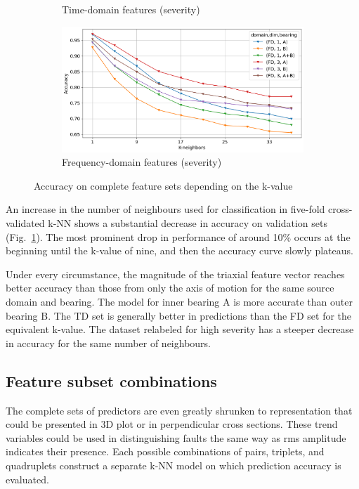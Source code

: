 \begin{figure}[h]
\begin{subfigure}[b]{0.48\textwidth}
        \caption{Time-domain features (severity)}
    \end{subfigure}
    \hfill
    \begin{subfigure}[b]{0.48\textwidth}
        \includegraphics[width=\textwidth]{assets/results/all-features/FD-severity.png}
        \caption{Frequency-domain features (severity)}
    \end{subfigure} 
    \caption{Accuracy on complete feature sets depending on the k-value}
    \label{fig:evaluation:complete-set-k-value}
\end{figure}

An increase in the number of neighbours used for classification in five-fold cross-validated k-NN shows a substantial decrease in accuracy on validation sets (Fig.~\ref{fig:evaluation:complete-set-k-value}). The most prominent drop in performance of around 10\% occurs at the beginning until the k-value of nine, and then the accuracy curve slowly plateaus.

Under every circumstance, the magnitude of the triaxial feature vector reaches better accuracy than those from only the axis of motion for the same source domain and bearing. The model for inner bearing A is more accurate than outer bearing B. The TD set is generally better in predictions than the FD set for the equivalent k-value. The dataset relabeled for high severity has a steeper decrease in accuracy for the same number of neighbours.

\subsection{Feature subset combinations}
The complete sets of predictors are even greatly shrunken to representation that could be presented in 3D plot or in perpendicular cross sections. These trend variables could be used in distinguishing faults the same way as rms amplitude indicates their presence. Each possible combinations of pairs, triplets, and quadruplets construct a separate k-NN model on which prediction accuracy is evaluated. 

